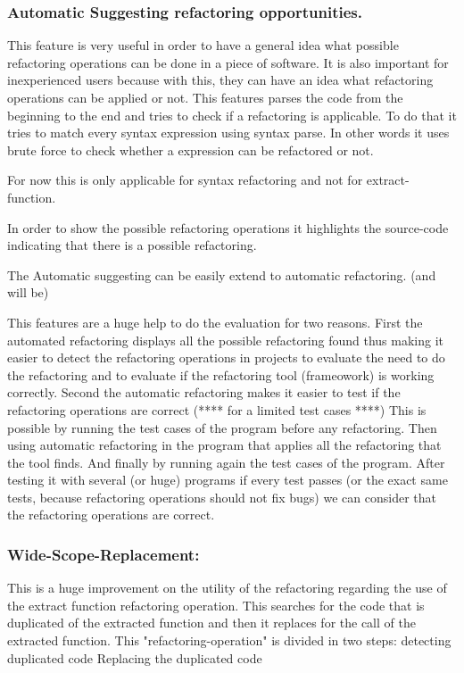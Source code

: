 \subsubsection{Automatic Suggesting refactoring opportunities.} %
This feature is very useful in order to have a general idea what possible refactoring
operations can be done in a piece of software. It is also important for inexperienced
users because with this, they can have an idea what refactoring operations can be applied or not.
This features parses the code from the beginning to the end and tries to check if a refactoring is applicable.
To do that it tries to match every syntax expression using syntax parse. In other words it
uses brute force to check whether a expression can be refactored or not.

For now this is only applicable for syntax refactoring and not for extract-function.

In order to show the possible refactoring operations it highlights the source-code indicating
that there is a possible refactoring.

The Automatic suggesting can be easily extend to automatic refactoring. (and will be)

This features are a huge help to do the evaluation for two reasons.
First the automated refactoring displays all the possible refactoring found thus making it easier
to detect the refactoring operations in projects to evaluate the need to do the refactoring and to evaluate
if the refactoring tool (frameowork) is working correctly.
Second the automatic refactoring makes it easier to test if the refactoring operations are correct (**** for a limited test cases ****)
This is possible by running the test cases of the program before any refactoring.
Then using automatic refactoring in the program that applies all the refactoring that the tool finds.
And finally by running again the test cases of the program.
After testing it with several (or huge) programs if every test passes (or the exact same tests, because refactoring operations should not fix bugs)
we can consider that the refactoring operations are correct.


\subsubsection{Wide-Scope-Replacement:}
This is a huge improvement on the utility of the refactoring regarding the use
of the extract function refactoring operation. This searches for the code that is
duplicated of the extracted function and then it replaces for the call of the
extracted function.
This "refactoring-operation" is divided in two steps:
detecting duplicated code
Replacing the duplicated code

